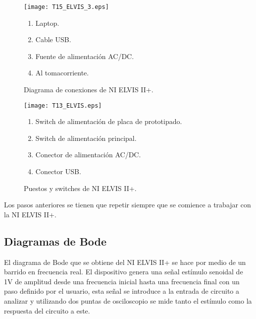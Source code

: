 	
	\begin{figure}[!ht]
		\begin{minipage}[c]{0.65\textwidth}
			\begin{center}
				\caption{Diagrama de conexiones de NI ELVIS II+.}
				\label{fig:T15_ELVIS_3}
				\texttt{[image: T15\_ELVIS\_3.eps]}
			\end{center}
		\end{minipage} \hfill \begin{minipage}[c]{0.3\textwidth}
			\begin{enumerate}
		  		\item Laptop.
				\item Cable USB.
				\item Fuente de alimentación AC/DC.
				\item Al tomacorriente.
			\end{enumerate}
		\end{minipage}
	\end{figure}
	
	
	\begin{figure}[!ht]
		\begin{minipage}[c]{0.65\textwidth}
			\begin{center}
				\caption{Puestos y switches de NI ELVIS II+.}
				\label{fig:T13_ELVIS}
				\texttt{[image: T13\_ELVIS.eps]}
			\end{center}
		\end{minipage} \hfill \begin{minipage}[c]{0.3\textwidth}
			\begin{enumerate}
		  		\item Switch de alimentación de placa de prototipado.
				\item Switch de alimentación principal.
				\item Conector de alimentación AC/DC.
				\item Conector USB.
			\end{enumerate}
		\end{minipage}
	\end{figure}
	
	Los pasos anteriores se tienen que repetir siempre que se comience a trabajar con la NI ELVIS II+.
	
		\subsection{Diagramas de Bode}\label{sec:diagrama_de_bode}
		
	El diagrama de Bode que se obtiene del NI ELVIS II+ se hace por medio de un barrido en frecuencia real. El dispositivo genera una señal estímulo senoidal de 1V de amplitud desde una frecuencia inicial hasta una frecuencia final con un paso definido por el usuario, esta señal se introduce a la entrada de circuito a analizar y utilizando dos puntas de osciloscopio se mide tanto el estímulo como la respuesta del circuito a este. 
	

